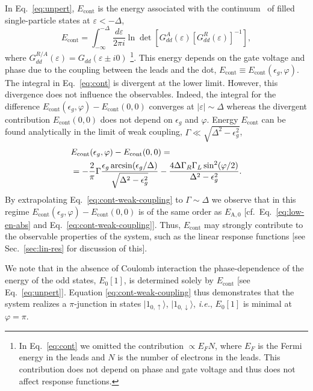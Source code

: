 \documentclass[aps,reprint,longbibliography, prb]{revtex4-2}
\begin{document}
{In Eq.~\eqref{eq:unpert}, $E_\mathrm{cont}$ is the energy associated with the continuum~\cite{beenakker1992} of filled single-particle states at $\varepsilon < -\Delta$,
\begin{equation}
    \label{eq:cont}
    E_\mathrm{cont} = \int_{-\infty}^{-\Delta} \frac{d\varepsilon}{2\pi i} \ln\det\left[G_{dd}^A(\varepsilon)\left[G_{dd}^R(\varepsilon)\right]^{-1}\right],
\end{equation}
where $G^{R/A}_{dd}(\varepsilon) = G_{dd}(\varepsilon \pm i0)$ \footnote{In Eq.~\eqref{eq:cont} we omitted the contribution $\propto E_F N$, where $E_F$ is the Fermi energy in the leads and $N$ is the number of electrons in the leads. This contribution does not depend on phase and gate voltage and thus does not affect response functions.}.
This energy depends on the gate voltage and phase due to the coupling between the leads and the dot,  $E_\mathrm{cont}\equiv E_\mathrm{cont}(\epsilon_g,\varphi)$.}
{The integral in Eq.~\eqref{eq:cont} is divergent at the lower limit.
However, this divergence does not influence the observables. Indeed, the integral for the difference $E_\mathrm{cont}(\epsilon_g,\varphi) - E_\mathrm{cont}(0,0)$ converges at $|\varepsilon| \sim \Delta$ whereas the divergent contribution $E_\mathrm{cont}(0,0)$ does not depend on $\epsilon_g$ and $\varphi$.} Energy ${E}_\mathrm{cont}$ can be found analytically in the limit of weak coupling, $\Gamma \ll \sqrt{\Delta^2 - \epsilon_g^2}$,
\begin{align}
    &E_\mathrm{cont}(\epsilon_g, \varphi)-E_\mathrm{cont}(0,0) =\notag\\
    &= -\frac{2}{\pi} \Gamma \frac{\epsilon_g \arcsin(\epsilon_g/\Delta)}{\sqrt{\Delta^2-\epsilon_g^2}} - \frac{4\Delta \Gamma_R \Gamma_L \sin^2(\varphi/2) }{\Delta^2-\epsilon_g^2}.
\label{eq:cont-weak-coupling}
\end{align}
By extrapolating Eq.~\eqref{eq:cont-weak-coupling} to $\Gamma \sim \Delta$ we observe that in this regime $E_\mathrm{cont}(\epsilon_g, \varphi)-E_\mathrm{cont}(0,0)$ is of the same order as $E_{\mathrm{A,0}}$ [cf.~Eq.~\eqref{eq:low-en-abs} and Eq.~\eqref{eq:cont-weak-coupling}]. Thus, $E_\mathrm{cont}$ may strongly contribute to the observable properties of the system, such as the linear response functions [see Sec.~\ref{sec:lin-res} for discussion of this].

We note that in the absence of Coulomb interaction the phase-dependence of the energy of the odd states, $E_0[1]$, is determined solely by $E_\mathrm{cont}$ [see Eq.~\eqref{eq:unpert}]. Equation \eqref{eq:cont-weak-coupling} thus demonstrates that the system realizes a $\pi$-junction in states $|1_{0,\uparrow}\rangle$, $|1_{0,\downarrow}\rangle$, \textit{i.e.}, $E_0[1]$ is minimal at $\varphi = \pi$.
\end{document}
